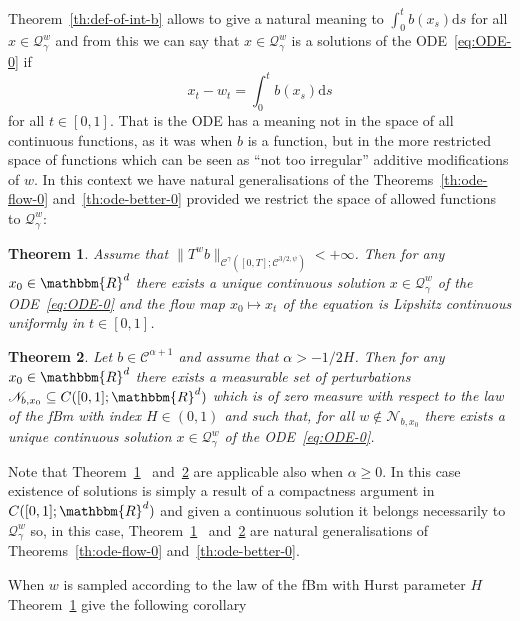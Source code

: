 \documentclass[a4paper,11pt]{article}
\newcommand{\mathd}{\mathrm{d}}
\newtheorem{theorem}{Theorem}[section]
\newcommand{\CC}{\mathscr C}
\newcommand{\CQ}{\mathscr Q}
\newcommand{\CN}{\mathscr N}
\begin{document}
Theorem~\ref{th:def-of-int-b} allows to give a natural meaning to
$\int_{0}^{t} b ( x_{s} ) \mathd s$ for all $x \in \CQ^{w}_{\gamma}$
and from this we can say that $x \in \CQ^{w}_{\gamma}$ is a solutions
of the ODE~{\eqref{eq:ODE-0}} if
\[ x_{t} -w_{t} = \int_{0}^{t} b ( x_{s} ) \mathd s \]
for all $t \in [ 0,1 ]$. That is the ODE has a meaning not in the space of all
continuous functions, as it was when $b$ is a function, but in the more
restricted space of functions which can be seen as ``not too irregular''
additive modifications of $w$. In this context we have natural generalisations
of the Theorems~\ref{th:ode-flow-0} and~\ref{th:ode-better-0} provided we
restrict the space of allowed functions to $\CQ^{w}_{\gamma}$:

\begin{theorem}
  \label{th:ode-flow}Assume that $\|T^{w} b\|_{\CC^{\gamma} ( [ 0,T ] ;
  \CC^{3/2, \psi} )} <+ \infty$. Then for any $x_{0} \in \mathbbm{R}^{d}$
  there exists a unique continuous solution $x \in \CQ^{w}_{\gamma}$
  of the ODE~{\eqref{eq:ODE-0}} and the flow map $x_{0} \mapsto x_{t}$ of the
  equation is Lipshitz continuous uniformly in $t \in [0,1]$.
\end{theorem}

\begin{theorem}
  \label{th:ode-better}Let $b \in \CC^{\alpha +1}$ and assume that $\alpha
  >-1/2H$. Then for any $x_{0} \in \mathbbm{R}^{d}$ there exists a measurable
  set of perturbations $\CN_{b,x_{0}} \subseteq C ( [ 0,1 ]
  ;\mathbbm{R}^{d} )$ which is of zero measure with respect to the law of the
  fBm with index $H \in ( 0,1 )$ and such that, for all $w \notin
  \CN_{b,x_{0}}$ there exists a unique continuous solution $x \in
  \CQ^{w}_{\gamma}$ of the ODE~{\eqref{eq:ODE-0}}.
\end{theorem}

Note that Theorem~\ref{th:ode-flow} \ and~\ref{th:ode-better} are applicable
also when $\alpha \geqslant 0$. In this case existence of solutions is simply
a result of a compactness argument in $C ( [ 0,1 ] ;\mathbbm{R}^{d} )$ and
given a continuous solution it belongs necessarily to
$\CQ^{w}_{\gamma}$ so, in this case, Theorem~\ref{th:ode-flow} \
and~\ref{th:ode-better} are natural generalisations of
Theorems~\ref{th:ode-flow-0} and~\ref{th:ode-better-0}.



When $w$ is sampled according to the law of the fBm with Hurst parameter $H$
Theorem~\ref{th:ode-flow} give the following corollary
\end{document}
